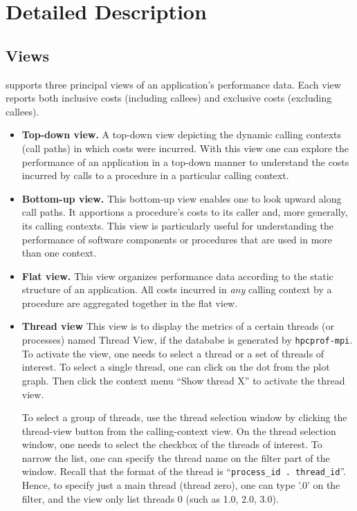 \documentclass[english]{article}
\begin{document}
\section{Detailed Description}

\subsection{Views}

 supports three principal views of an application's performance data.
Each view reports both inclusive costs (including callees) and exclusive costs (excluding callees).

\begin{itemize}

\item \textbf{Top-down view.}
A top-down view depicting the dynamic calling contexts (call paths) in which costs were incurred.
With this view one can explore the performance of an application in a top-down manner
to understand the costs incurred by calls to a procedure in a particular calling context.

\item \textbf{Bottom-up view.}
This bottom-up view enables one to look upward along call paths.
It apportions a procedure's costs to its caller and, more generally,
its calling contexts.
This view is particularly useful for understanding the performance of software components or procedures
that are used in more than one context.

\item \textbf{Flat view.}
This view organizes performance data according to the static structure of an application.
All costs incurred in \emph{any} calling context by a procedure are aggregated together in the flat view.

\item \textbf{Thread view}
	This view is to display the metrics of a certain threads (or processes) named Thread View, if the datababe is generated by \texttt{hpcprof-mpi}.
To activate the view, one needs to select a thread or a set of threads of interest.
To select a single thread, one can click on the dot from the plot graph.
Then click the context menu ``Show thread X'' to activate the thread view.

To select a group of threads, use the thread selection window by clicking the thread-view button from the calling-context view.
On the thread selection window, one needs to select the checkbox of the threads of interest. 
To  narrow the list, one can specify the thread name on the filter part of the window.
Recall that the format of the thread is ``\texttt{process\_id . thread\_id}''.
Hence, to specify just a main thread (thread zero), one can type '.0' on the filter, and the view only list threads 0 (such as 1.0, 2.0, 3.0).


\end{itemize}
\end{document}
